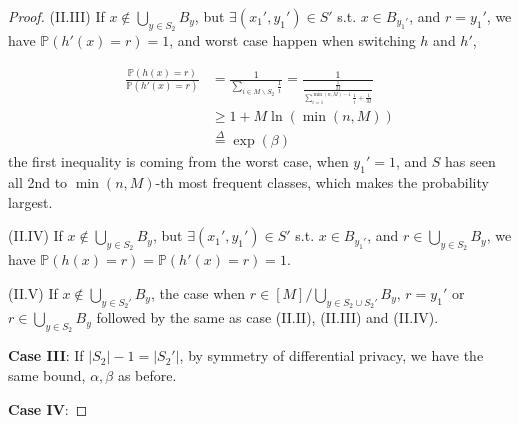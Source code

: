 \documentclass[12pt]{article}
\numberwithin{theorem}{section} %
\numberwithin{definition}{section} %
\numberwithin{assumption}{section} %
\numberwithin{lemma}{section} %
\numberwithin{remark}{section} %
\numberwithin{prop}{section} %
\numberwithin{corollary}{section} %
\numberwithin{example}{section} %
\numberwithin{question}{section} %
\numberwithin{problem}{section} %
\numberwithin{conjecture}{section} %
\numberwithin{append}{section} %
\numberwithin{property}{section} %
\def\P{{\mathbb P}}     %
\begin{document}
\begin{proof}
\noindent (II.III) If $x\notin \bigcup\limits_{y\in S_2} B_y$, but $\exists (x_1',y_1')\in S'$ s.t. $x\in B_{y_1'}$, and $r=y_1'$, we have $\P(h'(x)=r)=1$, and worst case happen when switching $h$ and $h'$, 

\begin{equation}
	\begin{aligned}
		\frac{\P(h(x)=r)}{\P(h'(x)=r)}& = \frac{ 1}{\sum\limits_{i\in M\backslash S_2} \frac{1}{i}}=\frac{1}{\frac{\frac{1}{M}}{ \sum\limits_{i=1}^{\min(n,M)-1} \frac{1}{i} +\frac{1}{M} }}\\
		& \ge 1+ M\ln(\min(n,M)) \\
		& \overset{\Delta}{=} \exp(\beta)
	\end{aligned}
\end{equation}
the first inequality is coming from the worst case, when $y_1'=1$, and $S$ has seen all 2nd to $\min(n,M )$-th most frequent classes, which makes the probability largest. 

\noindent (II.IV) If $x\notin \bigcup\limits_{y\in S_2} B_y$, but $\exists (x_1',y_1')\in S'$ s.t. $x\in B_{y_1'}$, and $r\in \bigcup\limits_{y\in S_2} B_y$, we have $\P(h(x)=r)=\P(h'(x)=r)=1$.


\noindent (II.V) If $x\notin \bigcup\limits_{y\in S_2'} B_y$, the case when $r\in[M]/\bigcup\limits_{y\in S_2\cup S_2'} B_y$, $r=y_1'$ or $r\in \bigcup\limits_{y\in S_2} B_y$ followed by the same as case (II.II), (II.III) and (II.IV).

	\vspace{0.2in}

\noindent \textbf{Case III}: If $|S_2|-1=|S_2'|$, by symmetry of differential privacy, we have the same bound, $\alpha,\beta$ as before.

	\vspace{0.2in}

	
	\noindent \textbf{Case IV}:	
		

\end{proof}
\end{document}
